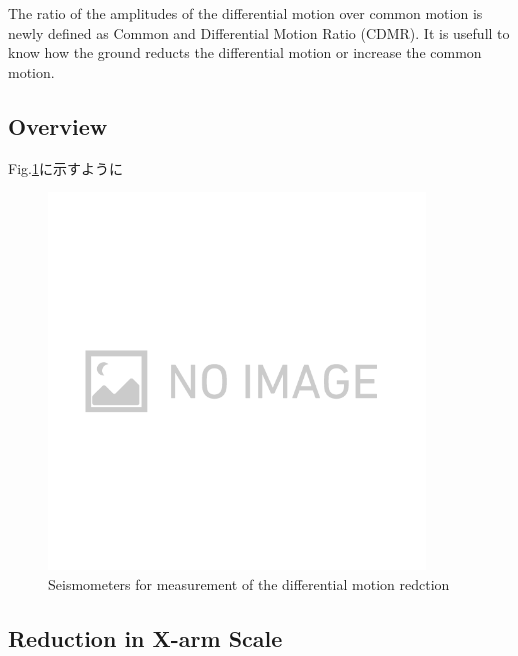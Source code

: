 The ratio of the amplitudes of the differential motion over common motion is newly defined as Common and Differential Motion Ratio (CDMR). It is usefull to know how the ground reducts the differential motion or increase the common motion. 

\subsection{Overview}
Fig.\ref{img:img318}に示すように

\begin{figure}[H]
  \begin{center}   
    \includegraphics[width=10.0cm]{./img_chap3/img318.png}
    \caption{Seismometers for measurement of the differential motion redction}\label{img:img318}
  \end{center}
\end{figure}


\subsection{Reduction in X-arm Scale}


